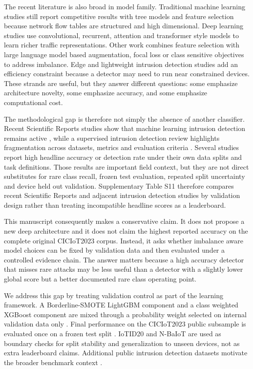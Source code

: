 \documentclass[fleqn,10pt]{wlscirep}
\begin{document}
The recent literature is also broad in model family. Traditional machine learning studies still report competitive results with tree models and feature selection because network flow tables are structured and high dimensional. Deep learning studies use convolutional, recurrent, attention and transformer style models to learn richer traffic representations. Other work combines feature selection with large language model based augmentation, focal loss or class sensitive objectives to address imbalance. Edge and lightweight intrusion detection studies add an efficiency constraint because a detector may need to run near constrained devices. These strands are useful, but they answer different questions: some emphasize architecture novelty, some emphasize accuracy, and some emphasize computational cost.

The methodological gap is therefore not simply the absence of another classifier. Recent Scientific Reports studies show that machine learning intrusion detection remains active \cite{alsubaei2025smart,yu2025attack,amine2025improved,ma2025llm,sarwar2025securing,singh2025attentional}, while a supervised intrusion detection review highlights fragmentation across datasets, metrics and evaluation criteria \cite{abushareha2026review}. Several studies report high headline accuracy or detection rate under their own data splits and task definitions. Those results are important field context, but they are not direct substitutes for rare class recall, frozen test evaluation, repeated split uncertainty and device held out validation. Supplementary Table S11 therefore compares recent Scientific Reports and adjacent intrusion detection studies by validation design rather than treating incompatible headline scores as a leaderboard.

This manuscript consequently makes a conservative claim. It does not propose a new deep architecture and it does not claim the highest reported accuracy on the complete original CICIoT2023 corpus. Instead, it asks whether imbalance aware model choices can be fixed by validation data and then evaluated under a controlled evidence chain. The answer matters because a high accuracy detector that misses rare attacks may be less useful than a detector with a slightly lower global score but a better documented rare class operating point.

We address this gap by treating validation control as part of the learning framework. A Borderline-SMOTE LightGBM component and a class weighted XGBoost component are mixed through a probability weight selected on internal validation data only \cite{chen2016xgboost}. Final performance on the CICIoT2023 public subsample is evaluated once on a frozen test split \cite{neto2023ciciot}. IoTID20 \cite{ullah2020iotid20} and N-BaIoT \cite{meidan2018nbaiot} are used as boundary checks for split stability and generalization to unseen devices, not as extra leaderboard claims. Additional public intrusion detection datasets motivate the broader benchmark context \cite{moustafa2015unsw,sharafaldin2018cicids,koroniotis2019botiot,ferrag2022edgeiiot}.
\end{document}
